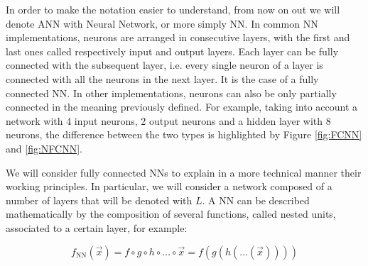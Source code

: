 In order to make the notation easier to understand, from now on out we will denote ANN with Neural Network, or more simply NN. In common NN implementations, neurons are arranged in consecutive layers, with the first and last ones called respectively input and output layers. Each layer can be fully connected with the subsequent layer, i.e. every single neuron of a layer is connected with all the neurons in the next layer. It is the case of a fully connected NN. In other implementations, neurons can also be only partially connected in the meaning previously defined. For example, taking into account a network with 4 input neurons, 2 output neurons and a hidden layer with 8 neurons, the difference between the two types is highlighted by Figure \ref{fig:FCNN} and \ref{fig:NFCNN}.

\vspace{5mm}
\begin{minipage}[b]{0.45\linewidth}
    \centering
    
    \label{fig:FCNN}
\end{minipage}
%
\hspace{2mm}
%
\begin{minipage}[b]{0.45\linewidth}
    \centering
    
    \label{fig:NFCNN}
\end{minipage}
\vspace{5mm}

We will consider fully connected NNs to explain in a more technical manner their working principles. In particular, we will consider a network composed of a number of layers that will be denoted with $L$. A NN can be described mathematically by the composition of several functions, called nested units, associated to a certain layer, for example:

\begin{equation}
    f_\mathrm{NN}(\vec{x}) = f \circ g \circ h \circ \dots \circ \vec{x} = f(g(h(\dots(\vec{x}))))
\end{equation}

